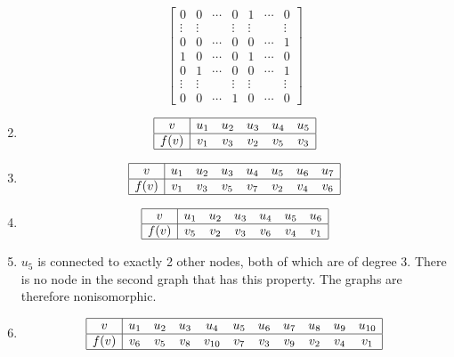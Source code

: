 \documentclass[12pt, A4]{article}
\newcommand{\enumset}[1]{\setcounter{enumi}{#1}}
\begin{document}
\begin{enumerate}
\begin{tasks}
\[\begin{bmatrix}
								0 & 0 & \cdots & 0 & 1 & \cdots & 0 \\
								\vdots & \vdots & & \vdots & \vdots & & \vdots \\
								0 & 0 & \cdots & 0 & 0 & \cdots & 1 \\
								1 & 0 & \cdots & 0 & 1 & \cdots & 0 \\
								0 & 1 & \cdots & 0 & 0 & \cdots & 1 \\
								\vdots & \vdots & & \vdots & \vdots & & \vdots \\
								0 & 0 & \cdots & 1 & 0 & \cdots & 0
							\end{bmatrix}\]
					\end{tasks}
				\enumset{38}
				\item
					\[\begin{array}{|c|*{5}{c}|}\hline
						v & u_1 & u_2 & u_3 & u_4 & u_5 \\\hline
						f(v) & v_1 & v_3 & v_2 & v_5 & v_3 \\\hline
					\end{array}\]
				\enumset{40}
				\item
					\[\begin{array}{|c|*{7}{c}|}\hline
						v & u_1 & u_2 & u_3 & u_4 & u_5 & u_6 & u_7 \\\hline
						f(v) & v_1 & v_3 & v_5 & v_7 & v_2 & v_4 & v_6  \\\hline
					\end{array}\]
				\enumset{42}
				\item
					\[\begin{array}{|c|*{6}{c}|}\hline
						v & u_1 & u_2 & u_3 & u_4 & u_5 & u_6 \\\hline
						f(v) & v_5 & v_2 & v_3 & v_6 & v_4 & v_1 \\\hline
					\end{array}\]
				\enumset{44}
				\item
					\(u_5\) is connected to exactly 2 other nodes, both of which are of degree \(3\). There is no node in the second graph that has this property. The graphs are therefore nonisomorphic.
				\enumset{46}
				\item
					\[\begin{array}{|c|*{10}{c}|}\hline
						v & u_1 & u_2 & u_3 & u_4 & u_5 & u_6 & u_7 & u_8 & u_9 & u_{10} \\\hline
						f(v) & v_6 & v_5 & v_8 & v_{10} & v_7 & v_3 & v_9 & v_2 & v_4 & v_1 \\\hline
					\end{array}\]
				\enumset{62}

\end{enumerate}
\end{document}

